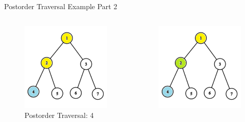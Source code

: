 \documentclass[aspectratio=169]{beamer}%
\begin{document}
\begin{frame}{Postorder Traversal Example Part 2}
    \begin{columns}
        \begin{column}{0.32\textwidth}
            \begin{figure}
                \centering
                \includegraphics[width = .9\linewidth]{tree-post 4.png}
                \caption{Postorder Traversal: 4}
            \end{figure}
        \end{column}
        \hfill
        \begin{column}{0.32\textwidth}
            \begin{figure}
                \centering
                \includegraphics[width = .9\linewidth]{tree-post 5.png}

\end{figure}
\end{column}
\end{columns}
\end{frame}
\end{document}
